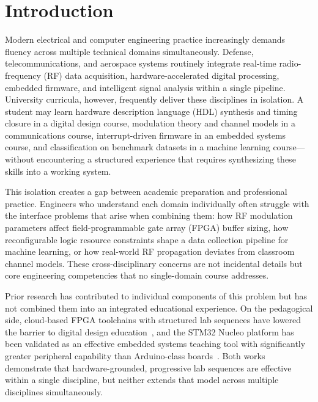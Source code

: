 \documentclass[conference]{IEEEtran}
\begin{document}
\section{Introduction}

Modern electrical and computer engineering practice increasingly demands fluency across multiple technical domains simultaneously. Defense, telecommunications, and aerospace systems routinely integrate real-time radio-frequency (RF) data acquisition, hardware-accelerated digital processing, embedded firmware, and intelligent signal analysis within a single pipeline. University curricula, however, frequently deliver these disciplines in isolation. A student may learn hardware description language (HDL) synthesis and timing closure in a digital design course, modulation theory and channel models in a communications course, interrupt-driven firmware in an embedded systems course, and classification on benchmark datasets in a machine learning course---without encountering a structured experience that requires synthesizing these skills into a working system.

This isolation creates a gap between academic preparation and professional practice. Engineers who understand each domain individually often struggle with the interface problems that arise when combining them: how RF modulation parameters affect field-programmable gate array (FPGA) buffer sizing, how reconfigurable logic resource constraints shape a data collection pipeline for machine learning, or how real-world RF propagation deviates from classroom channel models. These cross-disciplinary concerns are not incidental details but core engineering competencies that no single-domain course addresses.

Prior research has contributed to individual components of this problem but has not combined them into an integrated educational experience. On the pedagogical side, cloud-based FPGA toolchains with structured lab sequences have lowered the barrier to digital design education~\cite{b9}, and the STM32 Nucleo platform has been validated as an effective embedded systems teaching tool with significantly greater peripheral capability than Arduino-class boards~\cite{b10}. Both works demonstrate that hardware-grounded, progressive lab sequences are effective within a single discipline, but neither extends that model across multiple disciplines simultaneously.
\end{document}
